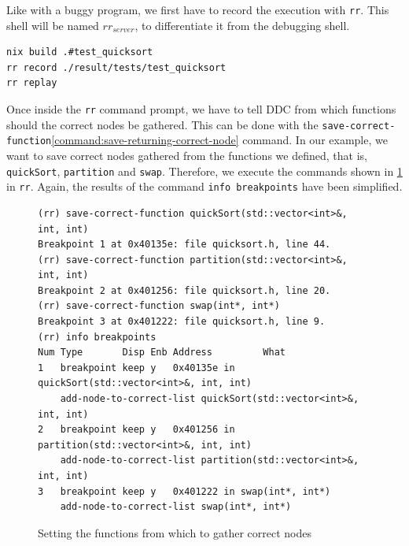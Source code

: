 Like with a buggy program, we first have to record the execution with \verb|rr|. This shell will be named \(rr_{server}\), to differentiate it from the debugging shell.
\begin{lstlisting}[language=bash, caption={Compiling, recording and replaying quickSort test cases}, frame=tb, label={lst:compileRecordReplayQuicksortTests}]
nix build .#test_quicksort
rr record ./result/tests/test_quicksort
rr replay
\end{lstlisting}
Once inside the \verb|rr| command prompt, we have to tell DDC from which functions should the correct nodes be gathered.
This can be done with the \verb|save-correct-function|\ref{command:save-returning-correct-node} command. In our example, we want to save correct nodes gathered from the functions we defined, that is, \verb|quickSort|, \verb|partition| and \verb|swap|. Therefore, we execute the commands shown in \ref{fig:saving-correct-functions} in \verb|rr|. Again, the results of the command \verb|info breakpoints| have been simplified.
\begin{figure}[h]
    \centering
    \caption{Setting the functions from which to gather correct nodes}
    \label{fig:saving-correct-functions}
    \begin{verbatim}
(rr) save-correct-function quickSort(std::vector<int>&, int, int)
Breakpoint 1 at 0x40135e: file quicksort.h, line 44.
(rr) save-correct-function partition(std::vector<int>&, int, int) 
Breakpoint 2 at 0x401256: file quicksort.h, line 20.
(rr) save-correct-function swap(int*, int*) 
Breakpoint 3 at 0x401222: file quicksort.h, line 9.
(rr) info breakpoints
Num Type       Disp Enb Address         What
1   breakpoint keep y   0x40135e in quickSort(std::vector<int>&, int, int)
    add-node-to-correct-list quickSort(std::vector<int>&, int, int)
2   breakpoint keep y   0x401256 in partition(std::vector<int>&, int, int)
    add-node-to-correct-list partition(std::vector<int>&, int, int)
3   breakpoint keep y   0x401222 in swap(int*, int*)
    add-node-to-correct-list swap(int*, int*)
    \end{verbatim}
\end{figure}


